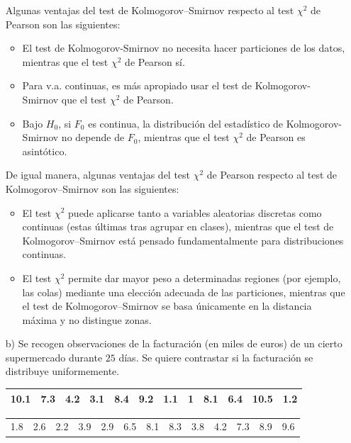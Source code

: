 \documentclass[12pt]{article}
\begin{document}
\begin{ejercicio}[1.5 puntos]
\begin{enumerate}
            \newpage

            Algunas ventajas del test de Kolmogorov--Smirnov respecto al test $\chi^2$ de Pearson son las siguientes:
                
            \begin{itemize}
                \item El test de Kolmogorov-Smirnov no necesita hacer particiones de los datos, mientras que el test $\chi^2$ de Pearson sí.
                \item Para v.a. continuas, es más apropiado usar el test de Kolmogorov-Smirnov que el test $\chi^2$ de Pearson.
                \item Bajo $H_0$, si $F_0$ es continua, la distribución del estadístico de Kolmogorov-Smirnov no depende de $F_0$, mientras
                que el test $\chi^2$ de Pearson es asintótico.
            \end{itemize}

            De igual manera, algunas ventajas del test $\chi^2$ de Pearson respecto al test de Kolmogorov--Smirnov son las siguientes:

            \begin{itemize}
                \item El test $\chi^2$ puede aplicarse tanto a variables aleatorias discretas como continuas (estas últimas tras agrupar en clases), 
                mientras que el test de Kolmogorov--Smirnov está pensado fundamentalmente para distribuciones continuas.
                \item El test $\chi^2$ permite dar mayor peso a determinadas regiones (por ejemplo, las colas) mediante una elección adecuada de las particiones, 
                mientras que el test de Kolmogorov--Smirnov se basa únicamente en la distancia máxima y no distingue zonas. 
            \end{itemize}

            
            \item[b)] Se recogen observaciones de la facturación (en miles de euros) de un cierto supermercado durante $25$ días.
            Se quiere contrastar si la facturación se distribuye uniformemente.
            \begin{center}
                \begin{tabular}{c|c|c|c|c|c|c|c|c|c|c|c}
                    10.1 & 7.3 & 4.2 & 3.1 & 8.4 & 9.2 & 1.1 & 1 & 8.1 & 6.4 & 10.5 & 1.2 \\
                    \hline
                \end{tabular}
                \begin{tabular}{c|c|c|c|c|c|c|c|c|c|c|c|c}
                    1.8 & 2.6 & 2.2 & 3.9 & 2.9 & 6.5 & 8.1 & 8.3 & 3.8 & 4.2 & 7.3 & 8.9 & 9.6
                \end{tabular}
            \end{center}


\end{enumerate}
\end{ejercicio}
\end{document}
